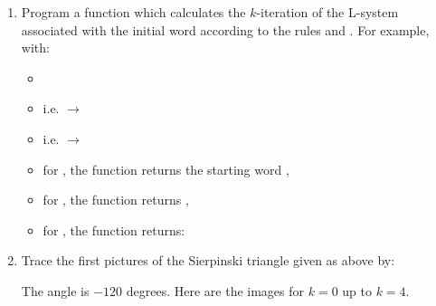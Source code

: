 \documentclass[11pt,class=report,crop=false]{standalone}
\begin{document}
\begin{activite}
\begin{enumerate}
 
  \item Program a function  
  which calculates the $k$-iteration of the L-system associated with the initial word  according to the rules  and .
   For example, with:
  \begin{itemize} 
    \item {}
    \item {} i.e.  $\rightarrow$ 
    \item {} i.e.  $\rightarrow$   
    \item for , the function returns the starting word ,
    \item for , the function returns ,
    \item for , the function returns:    
  \end{itemize}  

  \item Trace the first pictures of the Sierpinski triangle given as above by:  
  
 The angle is $-120$ degrees. Here are the images for $k=0$ up to $k=4$.
  

\end{enumerate}
\end{activite}
\end{document}
